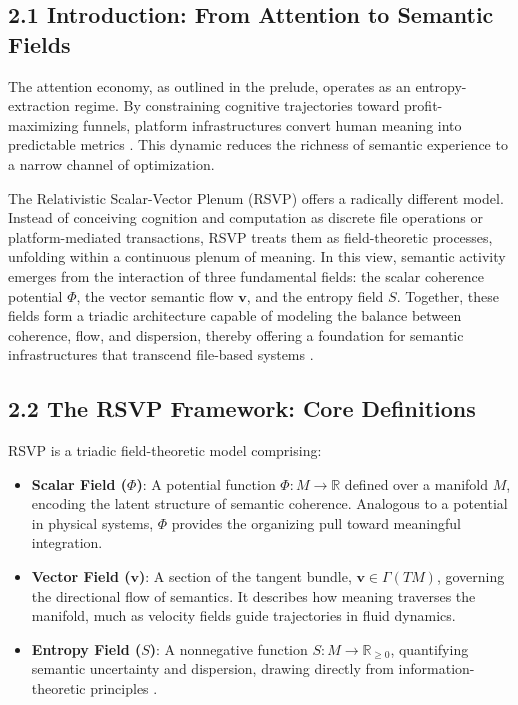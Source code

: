 \documentclass[12pt]{article}
\begin{document}
\subsection*{2.1 Introduction: From Attention to Semantic Fields}
The attention economy, as outlined in the prelude, operates as an entropy-extraction 
regime. By constraining cognitive trajectories toward profit-maximizing funnels, 
platform infrastructures convert human meaning into predictable metrics 
\citep{zuboff2019, lanier2018}. This dynamic reduces the richness of semantic experience 
to a narrow channel of optimization. 

The Relativistic Scalar-Vector Plenum (RSVP) offers a radically different model. 
Instead of conceiving cognition and computation as discrete file operations or 
platform-mediated transactions, RSVP treats them as field-theoretic processes, 
unfolding within a continuous plenum of meaning. In this view, semantic activity 
emerges from the interaction of three fundamental fields: the scalar coherence 
potential \(\Phi\), the vector semantic flow \(\mathbf{v}\), and the entropy field \(S\). 
Together, these fields form a triadic architecture capable of modeling the balance 
between coherence, flow, and dispersion, thereby offering a foundation for semantic 
infrastructures that transcend file-based systems \citep{bird1988, gromov1999, baez2011}. 

\subsection*{2.2 The RSVP Framework: Core Definitions}
RSVP is a triadic field-theoretic model comprising:
\begin{itemize}
    \item \textbf{Scalar Field (\(\Phi\))}: A potential function \(\Phi : M \to \mathbb{R}\) defined 
    over a manifold \(M\), encoding the latent structure of semantic coherence. Analogous 
    to a potential in physical systems, \(\Phi\) provides the organizing pull toward 
    meaningful integration.
    \item \textbf{Vector Field (\(\mathbf{v}\))}: A section of the tangent bundle, 
    \(\mathbf{v} \in \Gamma(TM)\), governing the directional flow of semantics. It 
    describes how meaning traverses the manifold, much as velocity fields guide 
    trajectories in fluid dynamics.
    \item \textbf{Entropy Field (\(S\))}: A nonnegative function \(S : M \to \mathbb{R}_{\geq 0}\), 
    quantifying semantic uncertainty and dispersion, drawing directly from 
    information-theoretic principles \citep{shannon1948}.
\end{itemize}
\end{document}
